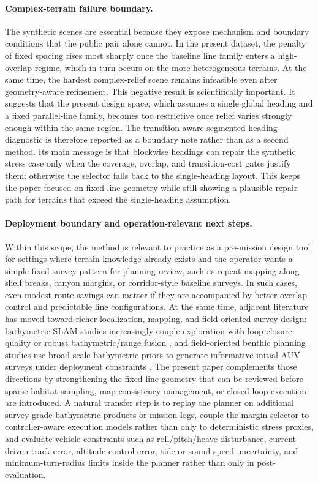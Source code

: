 \documentclass[jmse,article,submit,moreauthors]{Definitions/mdpi}
\begin{document}
\paragraph{Complex-terrain failure boundary.}
The synthetic scenes are essential because they expose mechanism and boundary conditions that the public pair alone cannot. In the present dataset, the penalty of fixed spacing rises most sharply once the baseline line family enters a high-overlap regime, which in turn occurs on the more heterogeneous terrains. At the same time, the hardest complex-relief scene remains infeasible even after geometry-aware refinement. This negative result is scientifically important. It suggests that the present design space, which assumes a single global heading and a fixed parallel-line family, becomes too restrictive once relief varies strongly enough within the same region. The transition-aware segmented-heading diagnostic is therefore reported as a boundary note rather than as a second method. Its main message is that blockwise headings can repair the synthetic stress case only when the coverage, overlap, and transition-cost gates justify them; otherwise the selector falls back to the single-heading layout. This keeps the paper focused on fixed-line geometry while still showing a plausible repair path for terrains that exceed the single-heading assumption.

\paragraph{Deployment boundary and operation-relevant next steps.}
Within this scope, the method is relevant to practice as a pre-mission design tool for settings where terrain knowledge already exists and the operator wants a simple fixed survey pattern for planning review, such as repeat mapping along shelf breaks, canyon margins, or corridor-style baseline surveys. In such cases, even modest route savings can matter if they are accompanied by better overlap control and predictable line configurations. At the same time, adjacent literature has moved toward richer localization, mapping, and field-oriented survey design: bathymetric SLAM studies increasingly couple exploration with loop-closure quality or robust bathymetric/range fusion \cite{ling2023active,zhu2025robust}, and field-oriented benthic planning studies use broad-scale bathymetric priors to generate informative initial AUV surveys under deployment constraints \cite{shields2023feature}. The present paper complements those directions by strengthening the fixed-line geometry that can be reviewed before sparse habitat sampling, map-consistency management, or closed-loop execution are introduced. A natural transfer step is to replay the planner on additional survey-grade bathymetric products or mission logs, couple the margin selector to controller-aware execution models rather than only to deterministic stress proxies, and evaluate vehicle constraints such as roll/pitch/heave disturbance, current-driven track error, altitude-control error, tide or sound-speed uncertainty, and minimum-turn-radius limits inside the planner rather than only in post-evaluation.
\end{document}

